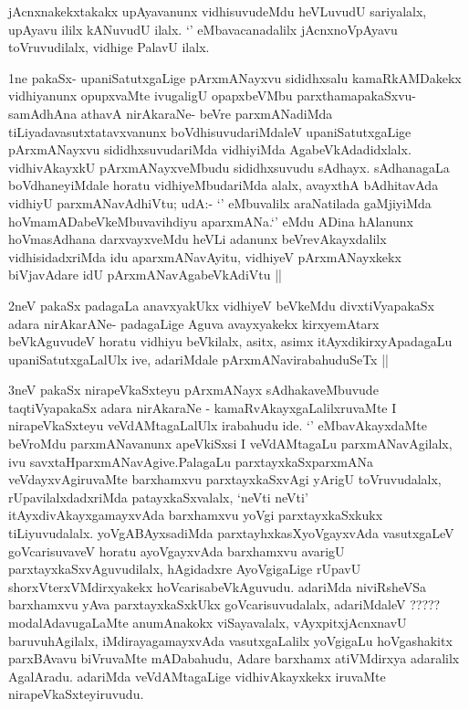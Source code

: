 \begin{artha}
jAcnxnakekxtakakx upAyavanunx vidhisuvudeMdu heVLuvudU sariyalalx,
upAyavu ililx kANuvudU ilalx. `\stext' eMbavacanadalilx jAcnxnoVpAyavu
toVruvudilalx, vidhige PalavU ilalx.
\end{artha}

\begin{center}


\end{center}


\begin{artha}
1ne pakaSx- upaniSatutxgaLige pArxmANayxvu sididhxsalu kamaRkAMDakekx
vidhiyanunx opupxvaMte ivugaligU opapxbeVMbu parxthamapakaSxvu-
samAdhAna athavA nirAkaraNe- beVre parxmANadiMda
tiLiyadavasutxtatavxvanunx boVdhisuvudariMdaleV upaniSatutxgaLige
pArxmANayxvu sididhxsuvudariMda vidhiyiMda
AgabeVkAdadidxlalx. vidhivAkayxkU pArxmANayxveMbudu sididhxsuvudu
sAdhayx. sAdhanagaLa boVdhaneyiMdale horatu vidhiyeMbudariMda alalx,
avayxthA bAdhitavAda vidhiyU parxmANavAdhiVtu; udA:- `\stext'
eMbuvalilx araNatilada gaMjiyiMda hoVmamADabeVkeMbuvavihdiyu
aparxmANa.`\stext' eMdu ADina hAlanunx hoVmasAdhana darxvayxveMdu
heVLi adanunx beVrevAkayxdalilx vidhisidadxriMda idu aparxmANavAyitu,
vidhiyeV pArxmANayxkekx biVjavAdare idU pArxmANavAgabeVkAdiVtu ||
\end{artha}

\begin{artha}
2neV pakaSx padagaLa anavxyakUkx vidhiyeV beVkeMdu divxtiVyapakaSx
adara nirAkarANe- padagaLige Aguva avayxyakekx kirxyemAtarx
beVkAguvudeV horatu vidhiyu beVkilalx, asitx, asimx
itAyxdikirxyApadagaLu upaniSatutxgaLalUlx ive, adariMdale
pArxmANavirabahuduSeTx ||
\end{artha}

\begin{artha}
3neV pakaSx nirapeVkaSxteyu pArxmANayx sAdhakaveMbuvude taqtiVyapakaSx
adara nirAkaraNe - kamaRvAkayxgaLalilxruvaMte I nirapeVkaSxteyu
veVdAMtagaLalUlx irabahudu ide. `\stext' eMbavAkayxdaMte beVroMdu
parxmANavanunx apeVkiSxsi I veVdAMtagaLu parxmANavAgilalx, ivu
savxtaHparxmANavAgive.PalagaLu parxtayxkaSxparxmANa veVdayxvAgiruvaMte
barxhamxvu parxtayxkaSxvAgi yArigU toVruvudalalx, rUpavilalxdadxriMda
patayxkaSxvalalx, `neVti neVti' itAyxdivAkayxgamayxvAda barxhamxvu
yoVgi parxtayxkaSxkukx tiLiyuvudalalx. yoVgABAyxsadiMda
parxtayhxkasXyoVgayxvAda vasutxgaLeV goVcarisuvaveV horatu
ayoVgayxvAda barxhamxvu avarigU parxtayxkaSxvAguvudilalx, hAgidadxre
AyoVgigaLige rUpavU shorxVterxVMdirxyakekx
hoVcarisabeVkAguvudu. adariMda niviRsheVSa barxhamxvu yAva
parxtayxkaSxkUkx goVcarisuvudalalx, adariMdaleV ?????
modalAdavugaLaMte anumAnakokx viSayavalalx, vAyxpitxjAcnxnavU
baruvuhAgilalx, iMdirayagamayxvAda vasutxgaLalilx yoVgigaLu
hoVgashakitx parxBAvavu biVruvaMte mADabahudu, Adare barxhamx
atiVMdirxya adaralilx AgalAradu. adariMda veVdAMtagaLige
vidhivAkayxkekx iruvaMte nirapeVkaSxteyiruvudu.
\end{artha}


